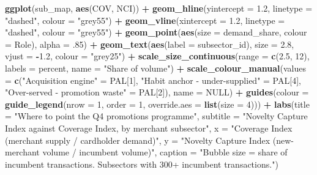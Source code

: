 \documentclass[
]{article}
\newenvironment{Shaded}{\begin{snugshade}}{\end{snugshade}}
\newcommand{\AttributeTok}[1]{\textcolor[rgb]{0.13,0.29,0.53}{#1}}
\newcommand{\ConstantTok}[1]{\textcolor[rgb]{0.56,0.35,0.01}{#1}}
\newcommand{\DecValTok}[1]{\textcolor[rgb]{0.00,0.00,0.81}{#1}}
\newcommand{\FloatTok}[1]{\textcolor[rgb]{0.00,0.00,0.81}{#1}}
\newcommand{\FunctionTok}[1]{\textcolor[rgb]{0.13,0.29,0.53}{\textbf{#1}}}
\newcommand{\NormalTok}[1]{#1}
\newcommand{\OtherTok}[1]{\textcolor[rgb]{0.56,0.35,0.01}{#1}}
\newcommand{\SpecialCharTok}[1]{\textcolor[rgb]{0.81,0.36,0.00}{\textbf{#1}}}
\newcommand{\StringTok}[1]{\textcolor[rgb]{0.31,0.60,0.02}{#1}}
\begin{document}
\begin{Shaded}
\begin{Highlighting}[]
\FunctionTok{ggplot}\NormalTok{(sub\_map, }\FunctionTok{aes}\NormalTok{(COV, NCI)) }\SpecialCharTok{+}
  \FunctionTok{geom\_hline}\NormalTok{(}\AttributeTok{yintercept =} \FloatTok{1.2}\NormalTok{, }\AttributeTok{linetype =} \StringTok{"dashed"}\NormalTok{, }\AttributeTok{colour =} \StringTok{"grey55"}\NormalTok{) }\SpecialCharTok{+}
  \FunctionTok{geom\_vline}\NormalTok{(}\AttributeTok{xintercept =} \FloatTok{1.2}\NormalTok{, }\AttributeTok{linetype =} \StringTok{"dashed"}\NormalTok{, }\AttributeTok{colour =} \StringTok{"grey55"}\NormalTok{) }\SpecialCharTok{+}
  \FunctionTok{geom\_point}\NormalTok{(}\FunctionTok{aes}\NormalTok{(}\AttributeTok{size =}\NormalTok{ demand\_share, }\AttributeTok{colour =}\NormalTok{ Role), }\AttributeTok{alpha =}\NormalTok{ .}\DecValTok{85}\NormalTok{) }\SpecialCharTok{+}
  \FunctionTok{geom\_text}\NormalTok{(}\FunctionTok{aes}\NormalTok{(}\AttributeTok{label =}\NormalTok{ subsector\_id), }\AttributeTok{size =} \FloatTok{2.8}\NormalTok{, }\AttributeTok{vjust =} \SpecialCharTok{{-}}\FloatTok{1.2}\NormalTok{, }\AttributeTok{colour =} \StringTok{"grey25"}\NormalTok{) }\SpecialCharTok{+}
  \FunctionTok{scale\_size\_continuous}\NormalTok{(}\AttributeTok{range =} \FunctionTok{c}\NormalTok{(}\FloatTok{2.5}\NormalTok{, }\DecValTok{12}\NormalTok{), }\AttributeTok{labels =}\NormalTok{ percent, }\AttributeTok{name =} \StringTok{"Share of volume"}\NormalTok{) }\SpecialCharTok{+}
  \FunctionTok{scale\_colour\_manual}\NormalTok{(}\AttributeTok{values =} \FunctionTok{c}\NormalTok{(}\StringTok{"Acquisition engine"} \OtherTok{=}\NormalTok{ PAL[}\DecValTok{1}\NormalTok{],}
                                 \StringTok{"Habit anchor {-} under{-}supplied"} \OtherTok{=}\NormalTok{ PAL[}\DecValTok{4}\NormalTok{],}
                                 \StringTok{"Over{-}served {-} promotion waste"} \OtherTok{=}\NormalTok{ PAL[}\DecValTok{2}\NormalTok{]), }\AttributeTok{name =} \ConstantTok{NULL}\NormalTok{) }\SpecialCharTok{+}
  \FunctionTok{guides}\NormalTok{(}\AttributeTok{colour =} \FunctionTok{guide\_legend}\NormalTok{(}\AttributeTok{nrow =} \DecValTok{1}\NormalTok{, }\AttributeTok{order =} \DecValTok{1}\NormalTok{, }\AttributeTok{override.aes =} \FunctionTok{list}\NormalTok{(}\AttributeTok{size =} \DecValTok{4}\NormalTok{))) }\SpecialCharTok{+}
  \FunctionTok{labs}\NormalTok{(}\AttributeTok{title =} \StringTok{"Where to point the Q4 promotions programme"}\NormalTok{,}
       \AttributeTok{subtitle =} \StringTok{"Novelty Capture Index against Coverage Index, by merchant subsector"}\NormalTok{,}
       \AttributeTok{x =} \StringTok{"Coverage Index  (merchant supply / cardholder demand)"}\NormalTok{,}
       \AttributeTok{y =} \StringTok{"Novelty Capture Index  (new{-}merchant volume / incumbent volume)"}\NormalTok{,}
       \AttributeTok{caption =} \StringTok{"Bubble size = share of incumbent transactions. Subsectors with 300+ incumbent transactions."}\NormalTok{)}
\end{Highlighting}
\end{Shaded}
\end{document}
